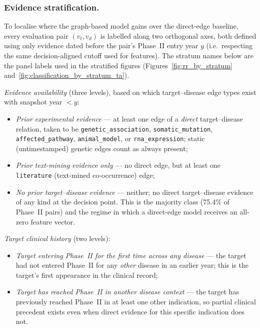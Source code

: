\documentclass[a4,center]{NAR}
\begin{document}
{\subsubsection{Evidence stratification.}
\label{sec:strata}

To localise where the graph-based model gains over the direct-edge
baseline, every evaluation pair $(v_t, v_d)$ is labelled along two
orthogonal axes, both defined using only evidence dated before the
pair's Phase~II entry year $y$ (i.e.\ respecting the same
decision-aligned cutoff used for features). The stratum names below
are the panel labels used in the stratified figures
(Figures~\ref{fig:rr_by_stratum} and~\ref{fig:classification_by_stratum_ta}).

\emph{Evidence availability} (three levels), based on which
target--disease edge types exist with snapshot year $< y$:
\begin{itemize}
\item \textit{Prior experimental evidence} --- at least one edge of a
\emph{direct} target--disease relation, taken to be
\texttt{genetic\_association}, \texttt{somatic\_mutation},
\texttt{affected\_pathway}, \texttt{animal\_model}, or
\texttt{rna\_expression}; static (untimestamped) genetic edges count
as always present;
\item \textit{Prior text-mining evidence only} --- no direct edge, but
at least one \texttt{literature} (text-mined co-occurrence) edge;
\item \textit{No prior target--disease evidence} --- neither; no
direct target--disease evidence of any kind at the decision point.
This is the majority class (75.4\% of Phase~II pairs) and the regime
in which a direct-edge model receives an all-zero feature vector.
\end{itemize}

\emph{Target clinical history} (two levels):
\begin{itemize}
\item \textit{Target entering Phase~II for the first time across any
disease} --- the target had not entered Phase~II for any \emph{other}
disease in an earlier year; this is the target's first appearance in
the clinical record;
\item \textit{Target has reached Phase~II in another disease context}
--- the target has previously reached Phase~II in at least one other
indication, so partial clinical precedent exists even when direct
evidence for this specific indication does not.
\end{itemize}

}
\end{document}
